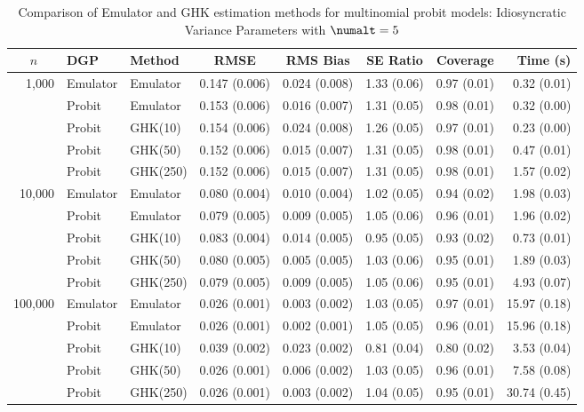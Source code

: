 \begin{table}[htbp]
\centering
\footnotesize
\begin{tabular}{@{}rllrrrrr@{}}
\toprule
\multicolumn{1}{c}{$n$} & \multicolumn{1}{l}{DGP} & \multicolumn{1}{l}{Method} & \multicolumn{1}{c}{RMSE} & \multicolumn{1}{c}{RMS Bias} & \multicolumn{1}{c}{SE Ratio} & \multicolumn{1}{c}{Coverage} & \multicolumn{1}{r}{Time (s)} \\
\midrule
\multirow{5}{*}{1,000} & Emulator & Emulator & 0.147 (0.006) & 0.024 (0.008) & 1.33 (0.06) & 0.97 (0.01) & 0.32 (0.01) \\
 & Probit & Emulator & 0.153 (0.006) & 0.016 (0.007) & 1.31 (0.05) & 0.98 (0.01) & 0.32 (0.00) \\
 & Probit & GHK(10) & 0.154 (0.006) & 0.024 (0.008) & 1.26 (0.05) & 0.97 (0.01) & 0.23 (0.00) \\
 & Probit & GHK(50) & 0.152 (0.006) & 0.015 (0.007) & 1.31 (0.05) & 0.98 (0.01) & 0.47 (0.01) \\
 & Probit & GHK(250) & 0.152 (0.006) & 0.015 (0.007) & 1.31 (0.05) & 0.98 (0.01) & 1.57 (0.02) \\
\midrule
\multirow{5}{*}{10,000} & Emulator & Emulator & 0.080 (0.004) & 0.010 (0.004) & 1.02 (0.05) & 0.94 (0.02) & 1.98 (0.03) \\
 & Probit & Emulator & 0.079 (0.005) & 0.009 (0.005) & 1.05 (0.06) & 0.96 (0.01) & 1.96 (0.02) \\
 & Probit & GHK(10) & 0.083 (0.004) & 0.014 (0.005) & 0.95 (0.05) & 0.93 (0.02) & 0.73 (0.01) \\
 & Probit & GHK(50) & 0.080 (0.005) & 0.005 (0.005) & 1.03 (0.06) & 0.95 (0.01) & 1.89 (0.03) \\
 & Probit & GHK(250) & 0.079 (0.005) & 0.009 (0.005) & 1.05 (0.06) & 0.95 (0.01) & 4.93 (0.07) \\
\midrule
\multirow{5}{*}{100,000} & Emulator & Emulator & 0.026 (0.001) & 0.003 (0.002) & 1.03 (0.05) & 0.97 (0.01) & 15.97 (0.18) \\
 & Probit & Emulator & 0.026 (0.001) & 0.002 (0.001) & 1.05 (0.05) & 0.96 (0.01) & 15.96 (0.18) \\
 & Probit & GHK(10) & 0.039 (0.002) & 0.023 (0.002) & 0.81 (0.04) & 0.80 (0.02) & 3.53 (0.04) \\
 & Probit & GHK(50) & 0.026 (0.001) & 0.006 (0.002) & 1.03 (0.05) & 0.96 (0.01) & 7.58 (0.08) \\
 & Probit & GHK(250) & 0.026 (0.001) & 0.003 (0.002) & 1.04 (0.05) & 0.95 (0.01) & 30.74 (0.45) \\
\bottomrule
\end{tabular}
\caption{Comparison of Emulator and GHK estimation methods for multinomial probit models: Idiosyncratic Variance Parameters with $\numalt=5$}
\label{tab:emulator_vs_ghk:5:psi}
\end{table}